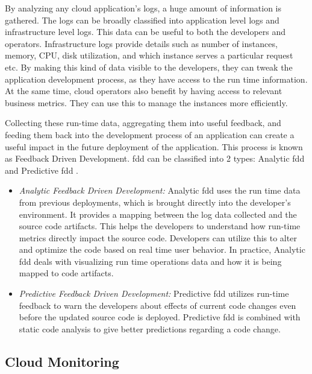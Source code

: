 \documentclass[article,type=msc,colorback,12pt,accentcolor=tud8b,table]{tudthesis}
\begin{document}
		By analyzing any cloud application's logs, a huge amount of information is gathered. The logs can be broadly classified into application level logs and infrastructure level logs. This data can be useful to both the developers and operators. Infrastructure logs provide details such as number of instances, memory, CPU, disk utilization, and which instance serves a particular request etc. By making this kind of data visible to the developers, they can tweak the application development process, as they have access to the run time information. At the same time, cloud operators also benefit by having access to relevant business metrics. They can use this to manage the instances more efficiently. 
		
		\par Collecting these run-time data, aggregating them into useful feedback, and feeding them back into the development process of an application can create a useful impact in the future deployment of the application. This process is known as Feedback Driven Development. \gls{fdd} can be classified into 2 types: Analytic \gls{fdd} and Predictive \gls{fdd} \cite{cito2015runtime}.
		
		\begin{itemize}
			\item{\textit{Analytic Feedback Driven Development: }}
			Analytic \gls{fdd} uses the run time data from previous deployments, which is brought directly into the developer's environment. It provides a mapping between the log data collected and the source code artifacts. This helps the developers to understand how run-time metrics directly impact the source code. Developers can utilize this to alter and optimize the code based on real time user behavior. In practice, Analytic \gls{fdd} deals with visualizing run time operations data and how it is being mapped to code artifacts. 
			
			\item{\textit{Predictive Feedback Driven Development: }}
			 Predictive \gls{fdd} utilizes run-time feedback to warn the developers about effects of current code changes even before the updated source code is deployed. Predictive \gls{fdd} is combined with static code analysis to give better predictions regarding a code change. 
		\end{itemize}
	
	\subsection{Cloud Monitoring}
 	
\end{document}

